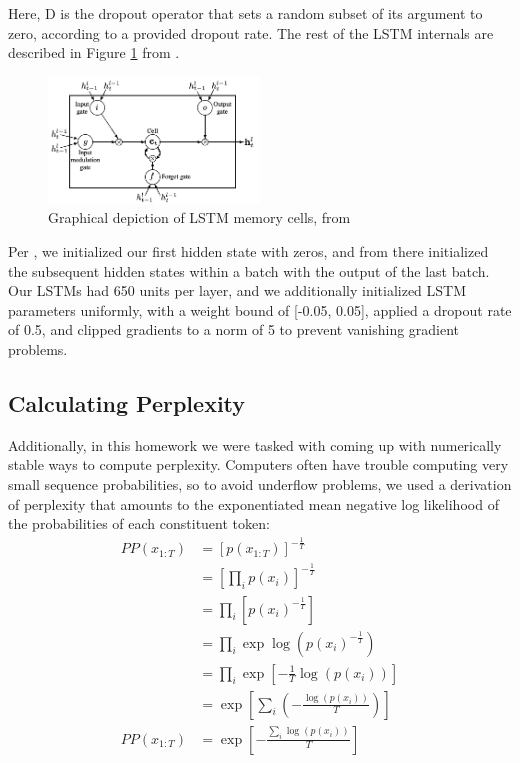 \documentclass[11pt]{article}
\begin{document}
Here, D is the dropout operator that sets a random subset of its argument to zero, according to a provided dropout rate. The rest of the LSTM internals are described in Figure \ref{fig:lstm} from \cite{zaremba2014recurrent}.
\begin{figure}[h]
  \centering
  \includegraphics[width=0.5\textwidth]{figures/lstm.png}
  \caption{Graphical depiction of LSTM memory cells, from \cite{zaremba2014recurrent}}
  \label{fig:lstm}
\end{figure}

Per \cite{zaremba2014recurrent}, we initialized our first hidden state with zeros, and from there initialized the subsequent hidden states within a batch with the output of the last batch. Our LSTMs had 650 units per layer, and we additionally initialized LSTM parameters uniformly, with a weight bound of [-0.05, 0.05], applied a dropout rate of 0.5, and clipped gradients to a norm of 5 to prevent vanishing gradient problems.


\subsection{Calculating Perplexity}

Additionally, in this homework we were tasked with coming up with numerically stable ways to compute perplexity. Computers often have trouble computing very small sequence probabilities, so to avoid underflow problems, we used a derivation of perplexity that amounts to the exponentiated mean negative log likelihood of the probabilities of each constituent token:
\begin{align*}
  PP(x_{1:T}) &= [p(x_{1:T})]^{-\frac{1}{T}} \\
  &= [\prod_{i} p(x_i)] ^{-\frac{1}{T}} \\
  &= \prod_{i} [p(x_i) ^{-\frac{1}{T}}] \\
  &= \prod_{i} \exp\log(p(x_i) ^{-\frac{1}{T}}) \\
  &= \prod_{i} \exp[-\frac{1}{T}  \log(p(x_i))]\\
  &= \exp[ \sum_{i}(
    -\frac{\log(p(x_i))}{T} 
  ) ]\\
  PP(x_{1:T}) &= \exp[
    -\frac{\sum_{i}{\log(p(x_i))}}{T} 
  ]\\
\end{align*}
\end{document}

